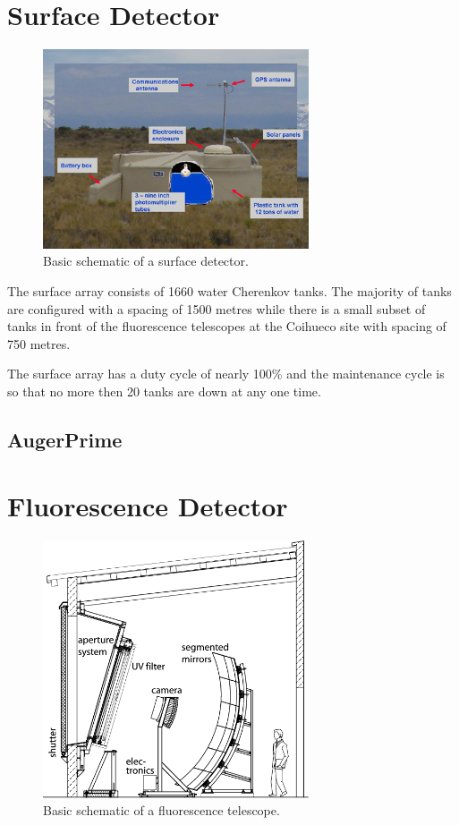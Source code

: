 \section{Surface Detector}

\begin{figure}
\centering
\includegraphics[width=0.7\textwidth]{chapters/pix/inside_surface_detector.jpg}
\caption{Basic schematic of a surface detector.}
\label{fig:SD_schematic}
\end{figure}

The surface array consists of 1660 water Cherenkov tanks. The majority of tanks are configured with a spacing of 1500 metres while there is a small subset of tanks in front of the fluorescence telescopes at the Coihueco site with spacing of 750 metres. 

The surface array has a duty cycle of nearly 100\% and the maintenance cycle is so that no more then 20 tanks are down at any one time.

\subsection{AugerPrime}

\section{Fluorescence Detector}

\begin{figure}
\centering
\includegraphics[width=0.7\textwidth]{chapters/pix/fluorescence_telescope.png}
\caption{Basic schematic of a fluorescence telescope.}
\label{fig:FD_schematic}
\end{figure}

